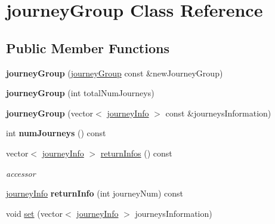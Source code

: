 \hypertarget{classjourneyGroup}{
\section{journeyGroup Class Reference}
\label{classjourneyGroup}
}
\subsection*{Public Member Functions}
\begin{DoxyCompactItemize}
\item 
\hypertarget{classjourneyGroup_a33b592eabdbabac62fcf73ef755ca854}{
{\bfseries journeyGroup} (\hyperlink{classjourneyGroup}{journeyGroup} const \&newJourneyGroup)}
\label{classjourneyGroup_a33b592eabdbabac62fcf73ef755ca854}

\item 
\hypertarget{classjourneyGroup_aa4a8495262df8b472c9e31b8add8246c}{
{\bfseries journeyGroup} (int totalNumJourneys)}
\label{classjourneyGroup_aa4a8495262df8b472c9e31b8add8246c}

\item 
\hypertarget{classjourneyGroup_aaa88a57ee228049be3b779acd3ecd0d5}{
{\bfseries journeyGroup} (vector$<$ \hyperlink{classjourneyInfo}{journeyInfo} $>$ const \&journeysInformation)}
\label{classjourneyGroup_aaa88a57ee228049be3b779acd3ecd0d5}

\item 
\hypertarget{classjourneyGroup_a02e53531314abbbb091f7d2d9941dfca}{
int {\bfseries numJourneys} () const }
\label{classjourneyGroup_a02e53531314abbbb091f7d2d9941dfca}

\item 
\hypertarget{classjourneyGroup_a93641731772a7b414e6c326ac80aab34}{
vector$<$ \hyperlink{classjourneyInfo}{journeyInfo} $>$ \hyperlink{classjourneyGroup_a93641731772a7b414e6c326ac80aab34}{returnInfos} () const }
\label{classjourneyGroup_a93641731772a7b414e6c326ac80aab34}

\begin{DoxyCompactList}\small\item\em accessor \end{DoxyCompactList}\item 
\hypertarget{classjourneyGroup_a7ac1e75ba6616429a7d87c0f4f0503ff}{
\hyperlink{classjourneyInfo}{journeyInfo} {\bfseries returnInfo} (int journeyNum) const }
\label{classjourneyGroup_a7ac1e75ba6616429a7d87c0f4f0503ff}

\item 
\hypertarget{classjourneyGroup_aec780bd4aecb25d68350cb8c68cbd423}{
void \hyperlink{classjourneyGroup_aec780bd4aecb25d68350cb8c68cbd423}{set} (vector$<$ \hyperlink{classjourneyInfo}{journeyInfo} $>$ journeysInformation)}
\label{classjourneyGroup_aec780bd4aecb25d68350cb8c68cbd423}


\end{DoxyCompactItemize}
